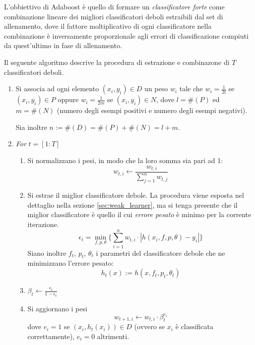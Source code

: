             L'obbiettivo di Adaboost è quello di formare un \emph{classificatore forte} come combinazione lineare dei migliori classificatori deboli estraibili dal set di allenamento, dove il fattore moltiplicativo di ogni classificatore nella combinazione è inversamente proporzionale agli errori di classificazione compiuti da quest'ultimo in fase di allenamento.

            Il seguente algoritmo descrive la procedura di estrazione e combinazone di $T$ classificatori deboli.

            \begin{enumerate}
                \item Si associa ad ogni elemento $(x_i, y_i) \in D$ un peso $w_i$ tale che $w_i = \frac{1}{2l}$ se $(x_i, y_i) \in P$ oppure $w_i = \frac{1}{2m}$ se $(x_i, y_i) \in N$, dove $l = \#(P)$ ed $m = \#(N)$ (numero degli esempi positivi e numero degli esempi negativi).

                Sia inoltre $n := \#(D) = \#(P) + \#(N) = l + m$.

                \item \emph{For} $t = [1:T]$
                \begin{enumerate}
                    \item Si normalizzano i pesi, in modo che la loro somma sia pari ad 1:
                    $$ w_{t,i} \leftarrow \frac{w_{t,i}}{\sum_{j = 1}^{n}w_{t,j}}$$

                    \item \label{adaboost_minimum_error}
                    Si estrae il miglior classificatore debole. La procedura viene esposta nel dettaglio nella sezione \ref{sec:weak_learner}, ma si tenga presente che il miglior classificatore è quello il cui \emph{errore pesato} è minimo per la corrente iterazione.
                    $$ \epsilon_t = \min_{f,p,\theta} \{
                    \sum_{i = 1}^{n} w_{t,i} \cdot |h(x_i, f, p, \theta) - y_i|
                    \} $$
                    Siano inoltre $f_t$, $p_t$, $\theta_t$ i parametri del classificatore debole che ne minimizzano l'errore pesato:
                    $$ h_t(x) := h(x, f_t, p_t, \theta_t) $$

                    \item \label{adaboost_beta} $\beta_t \leftarrow \frac{\epsilon_t}{1 - \epsilon_t}$

                    \item \label{adaboost_update_weights} Si aggiornano i pesi
                    $$ w_{t+1, i} \leftarrow w_{t,i} \cdot \beta_{t}^{e_i} $$
                    dove $e_i = 1$ se $(x_i, h_t(x_i)) \in D$ (ovvero se $x_i$ è classificata correttamente), $e_i = 0$ altrimenti.


\end{enumerate}
\end{enumerate}
